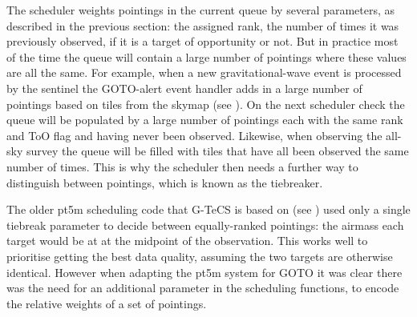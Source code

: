 \begin{colsection}

The scheduler weights pointings in the current queue by several parameters, as described in the previous section: the assigned rank, the number of times it was previously observed, if it is a target of opportunity or not. But in practice most of the time the queue will contain a large number of pointings where these values are all the same. For example, when a new gravitational-wave event is processed by the sentinel the GOTO-alert event handler adds in a large number of pointings based on tiles from the skymap (see ). On the next scheduler check the queue will be populated by a large number of pointings each with the same rank and ToO flag and having never been observed. Likewise, when observing the all-sky survey the queue will be filled with tiles that have all been observed the same number of times. This is why the scheduler then needs a further way to distinguish between pointings, which is known as the tiebreaker.

The older pt5m scheduling code that G-TeCS is based on (see ) used only a single tiebreak parameter to decide between equally-ranked pointings: the airmass each target would be at at the midpoint of the observation. This works well to prioritise getting the best data quality, assuming the two targets are otherwise identical. However when adapting the pt5m system for GOTO it was clear there was the need for an additional parameter in the scheduling functions, to encode the relative weights of a set of pointings.

\end{colsection}


